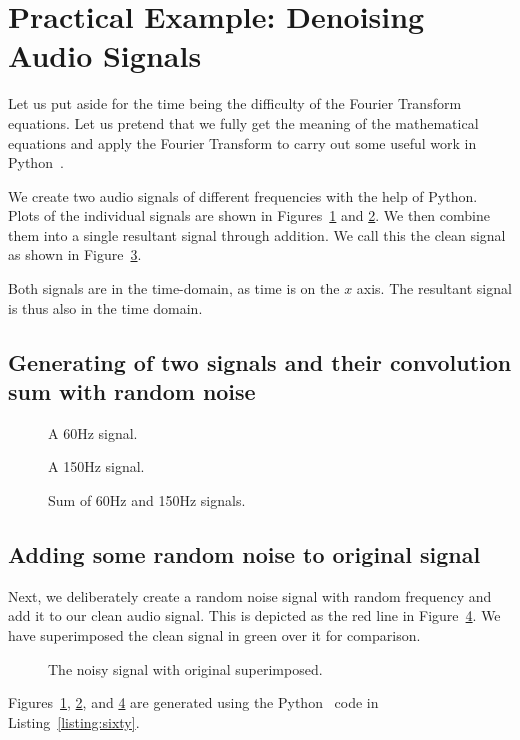 \documentclass[a4paper, 12pt]{scrartcl}
\begin{document}
\section{Practical Example: Denoising Audio Signals}
Let us put aside for the time being the difficulty of the Fourier Transform equations.
Let us pretend that we fully get the meaning of the mathematical equations and apply the Fourier Transform to carry out some useful work in Python~\cite{CleanUpNoise}.

We create two audio signals of different frequencies with the help of Python.
Plots of the individual signals are shown in Figures~\ref{fig:sixty} and \ref{fig:onefifty}.
We then combine them into a single resultant signal through addition.
We call this the clean signal as shown in Figure~\ref{fig:sumsignals}.

Both signals are in the time-domain, as time is on the $x$ axis.
The resultant signal is thus also in the time domain.
\subsection{Generating of two signals and their convolution sum with random noise}
\begin{figure}[H] 
  \centering
  \resizebox{\textwidth}{!}{}
  \caption{A 60Hz signal.}
  \label{fig:sixty}
\end{figure}

\begin{figure}[H] 
  \centering
  \resizebox{\textwidth}{!}{}
  \caption{A 150Hz signal.}
  \label{fig:onefifty}
\end{figure}

\begin{figure}[H] 
  \centering
  \resizebox{\textwidth}{!}{}
  \caption{Sum of 60Hz and 150Hz signals.}
  \label{fig:sumsignals}
\end{figure}


\subsection{Adding some random noise to original signal}

Next, we deliberately create a random noise signal with random frequency and add it to our clean audio signal.
This is depicted as the red line in Figure~\ref{fig:original_noisy}.
We have superimposed the clean signal in green over it for comparison.
\begin{figure}[H] 
  \centering
  \resizebox{\textwidth}{!}{}
  \caption{The noisy signal with original superimposed.}
  \label{fig:original_noisy}
\end{figure}
Figures~\ref{fig:sixty}, \ref{fig:onefifty}, and \ref{fig:original_noisy} are generated using the Python~\cite{fftnumpy} code in Listing~\ref{listing:sixty}.
\end{document}
